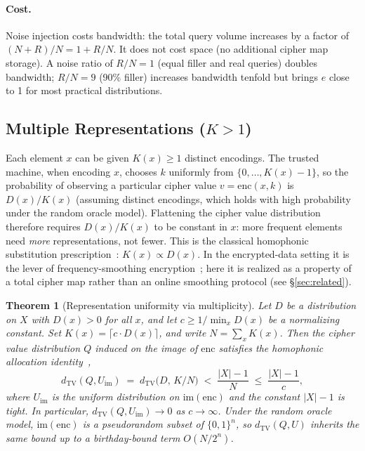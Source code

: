 \documentclass[11pt]{article}
\theoremstyle{definition}
\theoremstyle{plain}
\newtheorem{theorem}{Theorem}[section]
\theoremstyle{remark}
\newcommand{\enc}{\mathrm{enc}}
\newcommand{\TV}{d_{\mathrm{TV}}}
\newcommand{\B}{\{0,1\}}
\begin{document}
\paragraph{Cost.}
Noise injection costs bandwidth: the total query volume increases by a
factor of $(N + R) / N = 1 + R/N$.  It does not cost space (no
additional cipher map storage).  A noise ratio of $R/N = 1$ (equal
filler and real queries) doubles bandwidth; $R/N = 9$ (90\% filler)
increases bandwidth tenfold but brings $e$ close to 1 for most practical
distributions.

\subsection{Multiple Representations \texorpdfstring{($K > 1$)}{(K > 1)}}
\label{subsec:multiple-reps}

Each element $x$ can be given $K(x) \geq 1$ distinct encodings.  The
trusted machine, when encoding $x$, chooses $k$ uniformly from
$\{0, \ldots, K(x) - 1\}$, so the probability of observing a particular
cipher value $v = \enc(x, k)$ is $D(x)/K(x)$ (assuming distinct
encodings, which holds with high probability under the random oracle
model).  Flattening the cipher value distribution therefore requires
$D(x)/K(x)$ to be constant in $x$: more frequent elements need
\emph{more} representations, not fewer.  This is the classical
homophonic substitution prescription~\cite{simmons1979symmetric,
gunther1988universal,jendal1989information}: $K(x) \propto D(x)$.  In
the encrypted-data setting it is the lever of frequency-smoothing
encryption~\cite{lacharite2018frequency}; here it is realized as a
property of a total cipher map rather than an online smoothing protocol
(see \S\ref{sec:related}).

\begin{theorem}[Representation uniformity via multiplicity]
\label{thm:multiplicity}
Let $D$ be a distribution on $X$ with $D(x) > 0$ for all $x$, and let
$c \geq 1/\min_x D(x)$ be a normalizing constant.  Set
$K(x) = \lceil c \cdot D(x) \rceil$, and write $N = \sum_x K(x)$.
Then the cipher value distribution $Q$ induced on the image of $\enc$
satisfies the homophonic allocation
identity~\cite[Prop.~4.1]{towell2026cipher},
\begin{equation}
\TV(Q, U_{\mathrm{im}}) \;=\; \TV\!\bigl(D,\, K/N\bigr)
\;<\; \frac{|X| - 1}{N} \;\leq\; \frac{|X| - 1}{c},
\end{equation}
where $U_{\mathrm{im}}$ is the uniform distribution on
$\mathrm{im}(\enc)$ and the constant $|X|-1$ is tight.  In particular,
$\TV(Q, U_{\mathrm{im}}) \to 0$ as $c \to \infty$.  Under the random
oracle model, $\mathrm{im}(\enc)$ is a pseudorandom subset of $\B^n$,
so $\TV(Q, U)$ inherits the same bound up to a birthday-bound term
$O(N / 2^n)$.
\end{theorem}
\end{document}
